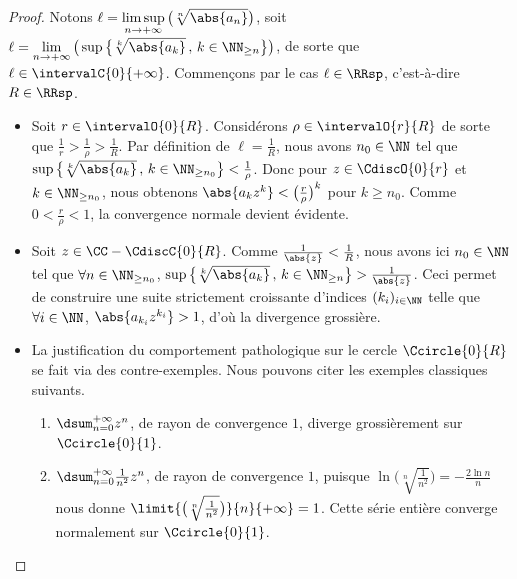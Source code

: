\begin{proof}
    Notons 
    $\displaystyle \ell
    = \limsup_{n \to +\infty} \big( \sqrt[n]{\abs{a_n}} \big)$,
    soit
    $\displaystyle \ell
    = \lim_{n \to +\infty} \big( \sup \big\{ \sqrt[k]{\abs{a_k}} \,,\, k \in \NN_{\geq n} \big\} \big)$,
    de sorte que $\ell \in \intervalC{0}{+\infty}$.
    Commençons par le cas $\ell \in \RRsp$, c'est-à-dire $R \in \RRsp$.
    \begin{itemize}
        \item Soit $r \in \intervalO{0}{R}$.
        Considérons $\rho  \in \intervalO{r}{R}$ de sorte que $\frac1r > \frac{1}{\rho} > \frac1R$.
        Par définition de $\ell = \frac1R$,
        nous avons $n_0 \in \NN$ tel que
        $\sup \big\{ \sqrt[k]{\abs{a_k}} \,,\, k \in \NN_{\geq n_0} \big\} < \frac{1}{\rho}$.
        Donc pour $z \in \CdiscO{0}{r}$ et $k \in \NN_{\geq n_0}$, nous obtenons
        $\abs{a_k z^k} < \big( \frac{r}{\rho} \big)^k$ pour $k \geq n_0$.
        Comme $0 < \frac{r}{\rho} < 1$, la convergence normale devient évidente.


        \item Soit $z \in \CC - \CdiscC{0}{R}$.
        Comme $\frac{1}{\abs{z}} < \frac{1}{R}$, nous avons ici $n_0 \in \NN$ tel que
        $\forall n \in \NN_{\geq n_0}$,
        $\sup \big\{ \sqrt[k]{\abs{a_k}} \,,\, k \in \NN_{\geq n} \big\} > \frac{1}{\abs{z}}$.
        Ceci permet de construire une suite strictement croissante d'indices $(k_i)_{i \in \NN}$
        telle que
        $\forall i \in \NN$, $\abs{a_{k_i} z^{k_i}} > 1$,
        d'où la divergence grossière.


        \item La justification du comportement pathologique sur le cercle $\Ccircle{0}{R}$ se fait via des contre-exemples. Nous pouvons citer les exemples classiques suivants.
        \begin{enumerate}[label=(\alph*)]
	        \item $\dsum_{n=0}^{+\infty} z^n$, 
	        de rayon de convergence $1$, 
	        diverge grossièrement sur $\Ccircle{0}{1}$.

	        \item $\dsum_{n=0}^{+\infty} \frac{1}{n^2} z^n$, 
	        de rayon de convergence $1$,
	        puisque 
	        $ \ln \big( \sqrt[n]{\frac{1}{n^2}} \big)
	        = -\frac{2 \ln n}{n}$
	        nous donne
	        $ \limit{\big( \sqrt[n]{\frac{1}{n^2}} \big)}%
	                {n}{+\infty}
	        = 1$.
	        Cette série entière converge normalement sur $\Ccircle{0}{1}$.


\end{enumerate}
\end{itemize}
\end{proof}
